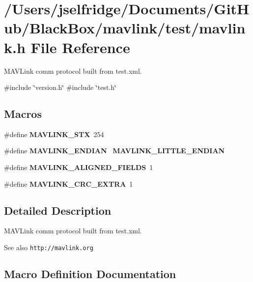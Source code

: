 \section{/\+Users/jselfridge/\+Documents/\+Git\+Hub/\+Black\+Box/mavlink/test/mavlink.h File Reference}
\label{test_2mavlink_8h}


M\+A\+V\+Link comm protocol built from test.\+xml.  


{\ttfamily \#include \char`\"{}version.\+h\char`\"{}}\newline
{\ttfamily \#include \char`\"{}test.\+h\char`\"{}}\newline
\subsection*{Macros}
\begin{DoxyCompactItemize}
\item 
\#define \textbf{ M\+A\+V\+L\+I\+N\+K\+\_\+\+S\+TX}~254
\item 
\#define \textbf{ M\+A\+V\+L\+I\+N\+K\+\_\+\+E\+N\+D\+I\+AN}~\textbf{ M\+A\+V\+L\+I\+N\+K\+\_\+\+L\+I\+T\+T\+L\+E\+\_\+\+E\+N\+D\+I\+AN}
\item 
\#define \textbf{ M\+A\+V\+L\+I\+N\+K\+\_\+\+A\+L\+I\+G\+N\+E\+D\+\_\+\+F\+I\+E\+L\+DS}~1
\item 
\#define \textbf{ M\+A\+V\+L\+I\+N\+K\+\_\+\+C\+R\+C\+\_\+\+E\+X\+T\+RA}~1
\end{DoxyCompactItemize}


\subsection{Detailed Description}
M\+A\+V\+Link comm protocol built from test.\+xml. 

\begin{DoxySeeAlso}{See also}
{\tt http\+://mavlink.\+org} 
\end{DoxySeeAlso}


\subsection{Macro Definition Documentation}
\mbox{\label{test_2mavlink_8h_a66ac6e7995651b5a5cb317194c1f46e0}} 
